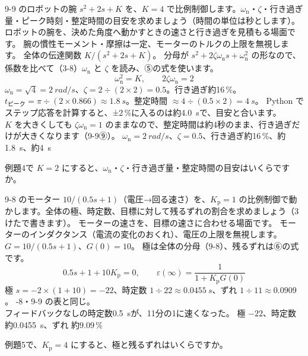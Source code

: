 \label{ph:波-4:ex4}
\begin{phreidai}[ロボットの腕の整定時間]
9-9 のロボットの腕 $s^2+2s+K$ を、$K=4$ で比例制御します。$\omega_{\mathrm n}$・$\zeta$・行き過ぎ量・ピーク時刻・整定時間の目安を求めましょう（時間の単位は秒とします）。
\phbamen
ロボットの腕を、決めた角度へ動かすときの速さと行き過ぎを見積もる場面です。
\phmushi
腕の慣性モーメント・摩擦は一定、モーターのトルクの上限を無視します。
\phzu
全体の伝達関数 $K/(s^2+2s+K)$。
\phriyu
分母が $s^2+2\zeta\omega_{\mathrm n}s+\omega_{\mathrm n}^2$ の形なので、係数を比べて（3-8）$\omega_{\mathrm n}$ と $\zeta$ を読み、⑤の式を使います。
\phtateru
\[\omega_{\mathrm n}^2=K,\qquad2\zeta\omega_{\mathrm n}=2\]
\phtoku
$\omega_{\mathrm n}=\sqrt4=\qty{2}{rad/s}$、$\zeta=2\div(2\times2)=0.5$。行き過ぎ約16\,\%。$t_{\text{ピーク}}=\pi\div(2\times0.866)\approx\qty{1.8}{s}$。整定時間 $\approx4\div(0.5\times2)=\qty{4}{s}$。
\phtashikame
Python でステップ応答を計算すると、±2\,\%に入るのは約\qty{4.0}{s}で、目安と合います。\\
$K$ を大きくしても $\zeta\omega_{\mathrm n}=1$ のままなので、整定時間は約4秒のまま、行き過ぎだけが大きくなります（9-9⑨）。
\kotae $\omega_{\mathrm n}=\qty{2}{rad/s}$、$\zeta=0.5$、行き過ぎ約16\,\%、約\qty{1.8}{s}、約\qty{4}{s}
\end{phreidai}
\begin{jibun}
例題4で $K=2$ にすると、$\omega_{\mathrm n}$・$\zeta$・行き過ぎ量・整定時間の目安はいくらですか。
\end{jibun}

\label{ph:波-4:ex5}
\begin{phreidai}[モーターの速度制御]
9-8 のモーター $10/(0.5s+1)$（電圧→回る速さ）を、$K_{\mathrm p}=1$ の比例制御で動かします。全体の極、時定数、目標に対して残るずれの割合を求めましょう（3けたで書きます）。
\phbamen
モーターの速さを、目標の速さに合わせる場面です。
\phmushi
モーターのインダクタンス（電流の変化のおくれ）、電圧の上限を無視します。
\phzu
$G=10/(0.5s+1)$、$G(0)=10$。
\phriyu
極は全体の分母（9-8）、残るずれは⑥の式です。
\phtateru
\[0.5s+1+10K_{\mathrm p}=0,\qquad\varepsilon(\infty)=\frac{1}{1+K_{\mathrm p}G(0)}\]
\phtoku
極 $s=-2\times(1+10)=-22$、時定数 $1\div22\approx\qty{0.0455}{s}$、ずれ $1\div11\approx0.0909$。
-8・9-9 の表と同じ。\\
フィードバックなしの時定数\qty{0.5}{s}が、11分の1に速くなった。
\kotae 極 $-22$、時定数 約\qty{0.0455}{s}、ずれ 約9.09\,\%
\end{phreidai}
\begin{jibun}
例題5で、$K_{\mathrm p}=4$ にすると、極と残るずれはいくらですか。
\end{jibun}

